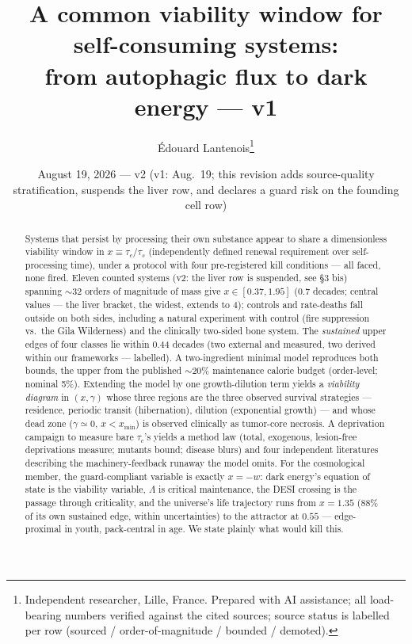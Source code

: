 \documentclass[11pt]{article}
\title{\textbf{A common viability window for self-consuming systems:\\ from autophagic flux to dark energy --- v1}}
\author{\'Edouard Lantenois\thanks{Independent researcher, Lille, France. Prepared with AI assistance; all load-bearing numbers verified against the cited sources; source status is labelled per row (sourced / order-of-magnitude / bounded / demoted).}}
\date{August 19, 2026 --- v2 (v1: Aug.\ 19; this revision adds source-quality stratification, suspends the liver row, and declares a guard risk on the founding cell row)}
\begin{document}
\maketitle
\begin{abstract}
Systems that persist by processing their own substance appear to share a dimensionless viability
window in $x \equiv \tau_c/\tau_s$ (independently defined renewal requirement over self-processing
time), under a protocol with four pre-registered kill conditions --- all faced, none fired.
Eleven counted systems (v2: the liver row is suspended, see \S3 bis) spanning $\sim$32 orders of magnitude of mass give $x \in [0.37, 1.95]$
(0.7 decades; central values --- the liver bracket, the widest, extends to 4); controls and rate-deaths fall outside on both sides, including a natural experiment
with control (fire suppression vs.\ the Gila Wilderness) and the clinically two-sided bone system.
The \emph{sustained} upper edges of four classes lie within 0.44 decades (two external and
measured, two derived within our frameworks --- labelled). A two-ingredient minimal model
reproduces both bounds, the upper from the published $\sim$20\% maintenance calorie budget
(order-level; nominal 5\%). Extending the model by one growth-dilution term yields a
\emph{viability diagram} in $(x, \gamma)$ whose three regions are the three observed survival
strategies --- residence, periodic transit (hibernation), dilution (exponential growth) --- and
whose dead zone ($\gamma \simeq 0$, $x < x_{\min}$) is observed clinically as tumor-core necrosis.
A deprivation campaign to measure bare $\tau_c$'s yields a method law (total, exogenous,
lesion-free deprivations measure; mutants bound; disease blurs) and four independent literatures
describing the machinery-feedback runaway the model omits. For the cosmological member, the
guard-compliant variable is exactly $x = -w$: dark energy's equation of state is the viability
variable, $\Lambda$ is critical maintenance, the DESI crossing is the passage through criticality,
and the universe's life trajectory runs from $x = 1.35$ (88\% of its own sustained edge, within
uncertainties) to the attractor at $0.55$ --- edge-proximal in youth, pack-central in age.
We state plainly what would kill this.
\end{abstract}
\end{document}
